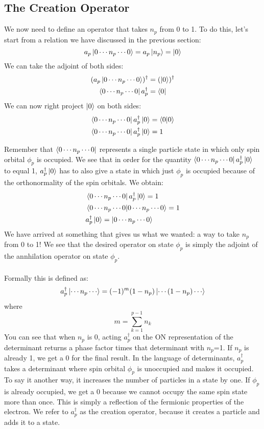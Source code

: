 \documentclass{article}
\begin{document}
\subsection{The Creation Operator}
We now need to define an operator that takes $n_p$ from 0 to 1.
To do this, let's start from a relation we have discussed in the previous section: 
\[a_p \ket{0 \cdots n_p \cdots0} = a_p \ket{n_p} = \ket{0} \]
We can take the adjoint of both sides: 
\begin{align*}
(a_p \ket{0 \cdots n_p \cdots0})^\dagger &= (\ket{0})^\dagger \\
\bra{0 \cdots n_p \cdots0} a_p^\dagger &= \bra{0} \\
\end{align*}
We can now right project $\ket{0}$ on both sides: 
\begin{align*}
\bra{0 \cdots n_p \cdots0} a_p^\dagger \ket{0} &= \braket{0 | 0}  \\
\bra{0 \cdots n_p \cdots0} a_p^\dagger \ket{0} &= 1  \\
\end{align*}

Remember that $\bra{0 \cdots n_p \cdots0} $ represents a single particle state in which only spin orbital $\phi_p$ is occupied. 
We see that in order for the quantity $\bra{0 \cdots n_p \cdots0} a_p^\dagger \ket{0}$ to equal 1, $a_p^\dagger \ket{0}$ has to also give a state in which just $\phi_p$ is occupied
because of the orthonormality of the spin orbitals. We obtain:
\begin{align*}
&\bra{0 \cdots n_p \cdots0} a_p^\dagger \ket{0} = 1 \\
&\braket{0 \cdots n_p \cdots0 | 0 \cdots n_p \cdots0 } = 1  \\
&a_p^\dagger \ket{0}  = \ket{0 \cdots n_p \cdots0 } \\
\end{align*}
We have arrived at something that gives us what we wanted: a way to take $n_p$ from 0 to 1! 
We see that the desired operator on state $\phi_p$ is simply the adjoint of the annhilation operator on state $\phi_p$.\\
\\
Formally this is defined as:
\begin{equation}
a_p^\dagger \ket{\cdots n_p \cdots} = (-1)^{m} (1 - n_p) \ket{\cdots (1-n_p) \cdots} 
\end{equation}
where 
\[m = \sum_{k=1}^{p-1} n_k \]
You can see that when $n_p$ is 0, acting $a_p^\dagger$ on the ON representation of the determinant returns a phase factor times that determinant with $n_p$=1. 
If $n_p$ is already 1, we get a 0 for the final result.
In the language of determinants, $a_p^\dagger$ takes a determinant where spin orbital $\phi_p$ is unoccupied and makes it occupied. 
To say it another way, it increases the number of particles in a state by one. 
If $\phi_p$ is already occupied, we get a 0 because we cannot occupy the same spin state more than once. 
This is simply a reflection of the fermionic properties of the electron. 
We refer to $a_p^\dagger$ as the creation operator, because it creates a particle and adds it to a state. 
\end{document}
